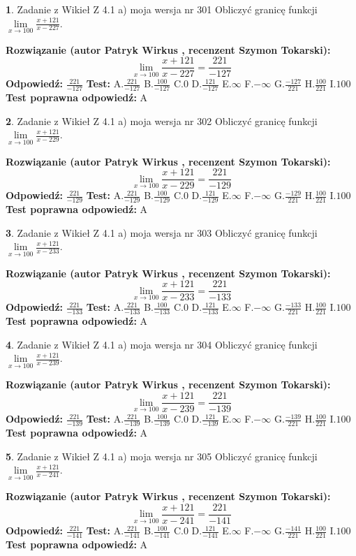\documentclass[12pt, a4paper]{article}
\theoremstyle{definition} %
\newtheorem{zad}{}
\newcommand{\zadStart}[1]{\begin{zad}#1\newline}
\newcommand{\zadStop}{\end{zad}}
\newcommand{\rozwStart}[2]{\noindent \textbf{Rozwiązanie (autor #1 , recenzent #2): }\newline}
\newcommand{\rozwStop}{\newline}
\newcommand{\odpStart}{\noindent \textbf{Odpowiedź:}\newline}
\newcommand{\odpStop}{\newline}
\newcommand{\testStart}{\noindent \textbf{Test:}\newline}
\newcommand{\testStop}{\newline}
\newcommand{\kluczStart}{\noindent \textbf{Test poprawna odpowiedź:}\newline}
\newcommand{\kluczStop}{\newline}
\begin{document}
\zadStart{Zadanie z Wikieł Z 4.1 a) moja wersja nr 301}
Obliczyć granicę funkcji $\lim\limits_{x\to100}\frac{x+121}{x-227}$.
\zadStop
\rozwStart{Patryk Wirkus}{Szymon Tokarski}
$$\lim\limits_{x\to100}\frac{x+121}{x-227} = \frac{221}{-127}$$
\rozwStop
\odpStart
$\frac{221}{-127}$
\odpStop
\testStart
A.$\frac{221}{-127}$
B.$\frac{100}{-127}$
C.$0$
D.$\frac{121}{-127}$
E.$\infty$
F.$-\infty$
G.$\frac{-127}{221}$
H.$\frac{100}{221}$
I.$100$
\testStop
\kluczStart
A
\kluczStop



\zadStart{Zadanie z Wikieł Z 4.1 a) moja wersja nr 302}
Obliczyć granicę funkcji $\lim\limits_{x\to100}\frac{x+121}{x-229}$.
\zadStop
\rozwStart{Patryk Wirkus}{Szymon Tokarski}
$$\lim\limits_{x\to100}\frac{x+121}{x-229} = \frac{221}{-129}$$
\rozwStop
\odpStart
$\frac{221}{-129}$
\odpStop
\testStart
A.$\frac{221}{-129}$
B.$\frac{100}{-129}$
C.$0$
D.$\frac{121}{-129}$
E.$\infty$
F.$-\infty$
G.$\frac{-129}{221}$
H.$\frac{100}{221}$
I.$100$
\testStop
\kluczStart
A
\kluczStop



\zadStart{Zadanie z Wikieł Z 4.1 a) moja wersja nr 303}
Obliczyć granicę funkcji $\lim\limits_{x\to100}\frac{x+121}{x-233}$.
\zadStop
\rozwStart{Patryk Wirkus}{Szymon Tokarski}
$$\lim\limits_{x\to100}\frac{x+121}{x-233} = \frac{221}{-133}$$
\rozwStop
\odpStart
$\frac{221}{-133}$
\odpStop
\testStart
A.$\frac{221}{-133}$
B.$\frac{100}{-133}$
C.$0$
D.$\frac{121}{-133}$
E.$\infty$
F.$-\infty$
G.$\frac{-133}{221}$
H.$\frac{100}{221}$
I.$100$
\testStop
\kluczStart
A
\kluczStop



\zadStart{Zadanie z Wikieł Z 4.1 a) moja wersja nr 304}
Obliczyć granicę funkcji $\lim\limits_{x\to100}\frac{x+121}{x-239}$.
\zadStop
\rozwStart{Patryk Wirkus}{Szymon Tokarski}
$$\lim\limits_{x\to100}\frac{x+121}{x-239} = \frac{221}{-139}$$
\rozwStop
\odpStart
$\frac{221}{-139}$
\odpStop
\testStart
A.$\frac{221}{-139}$
B.$\frac{100}{-139}$
C.$0$
D.$\frac{121}{-139}$
E.$\infty$
F.$-\infty$
G.$\frac{-139}{221}$
H.$\frac{100}{221}$
I.$100$
\testStop
\kluczStart
A
\kluczStop



\zadStart{Zadanie z Wikieł Z 4.1 a) moja wersja nr 305}
Obliczyć granicę funkcji $\lim\limits_{x\to100}\frac{x+121}{x-241}$.
\zadStop
\rozwStart{Patryk Wirkus}{Szymon Tokarski}
$$\lim\limits_{x\to100}\frac{x+121}{x-241} = \frac{221}{-141}$$
\rozwStop
\odpStart
$\frac{221}{-141}$
\odpStop
\testStart
A.$\frac{221}{-141}$
B.$\frac{100}{-141}$
C.$0$
D.$\frac{121}{-141}$
E.$\infty$
F.$-\infty$
G.$\frac{-141}{221}$
H.$\frac{100}{221}$
I.$100$
\testStop
\kluczStart
A
\kluczStop
\end{document}
